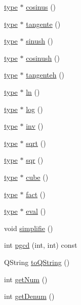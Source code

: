 \begin{DoxyCompactItemize}
\item 
\hyperlink{classtype}{type} $\ast$ \hyperlink{classrationnel_ac89f01b8f5927ba88ecd60a2f6996d2d}{cosinus} ()
\item 
\hyperlink{classtype}{type} $\ast$ \hyperlink{classrationnel_a0f189c649bad58fb78894a19ec7b21f4}{tangente} ()
\item 
\hyperlink{classtype}{type} $\ast$ \hyperlink{classrationnel_afbf300cd97ee35b0302f7365ed84fb95}{sinush} ()
\item 
\hyperlink{classtype}{type} $\ast$ \hyperlink{classrationnel_aef9f5ccfdc0a0344e64e5f1f77adab0d}{cosinush} ()
\item 
\hyperlink{classtype}{type} $\ast$ \hyperlink{classrationnel_a45d63050134594c5a60c7a594021d7e5}{tangenteh} ()
\item 
\hyperlink{classtype}{type} $\ast$ \hyperlink{classrationnel_a59b1b593905de8676db02d5d2a5554c3}{ln} ()
\item 
\hyperlink{classtype}{type} $\ast$ \hyperlink{classrationnel_a6bed14bda0b8546528454e7b2030645d}{log} ()
\item 
\hyperlink{classtype}{type} $\ast$ \hyperlink{classrationnel_a75336cd670c61195c833f8459c02c3b5}{inv} ()
\item 
\hyperlink{classtype}{type} $\ast$ \hyperlink{classrationnel_ad37ab4380b5ff66104748ecc0bf5babe}{sqrt} ()
\item 
\hyperlink{classtype}{type} $\ast$ \hyperlink{classrationnel_ab9f341fd09499253dd1f9b6f15795576}{sqr} ()
\item 
\hyperlink{classtype}{type} $\ast$ \hyperlink{classrationnel_a9bca6086c4a5083765d87324418a86ab}{cube} ()
\item 
\hyperlink{classtype}{type} $\ast$ \hyperlink{classrationnel_a51333d6a00b4307407f1ea324902eeb8}{fact} ()
\item 
\hyperlink{classtype}{type} $\ast$ \hyperlink{classrationnel_aa66761d9af57e34a2ca44d5858dedf00}{eval} ()
\item 
void \hyperlink{classrationnel_a236e82f84556d0fcd978164529f9bf67}{simplifie} ()
\item 
int \hyperlink{classrationnel_a7e10c925a450321f53a50636177561e5}{pgcd} (int, int) const 
\item 
Q\-String \hyperlink{classrationnel_a6c905c688ae54647074a5ddf3ef648bd}{to\-Q\-String} ()
\item 
int \hyperlink{classrationnel_a9c4167d0aafd3bf9460ae58a81a0d29f}{get\-Num} ()
\item 
int \hyperlink{classrationnel_abb14c1aafb5b4e8f28d5c770e2e1523e}{get\-Denum} ()
\end{DoxyCompactItemize}

